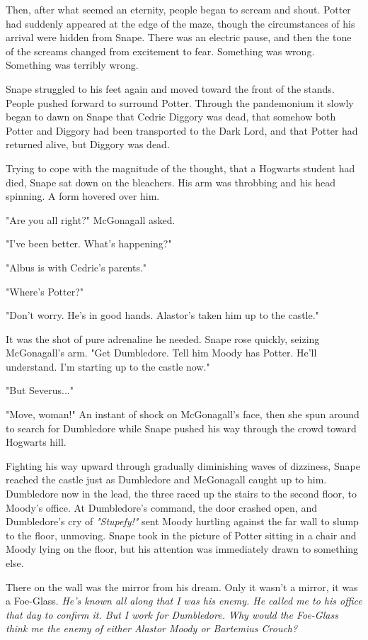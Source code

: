 Then, after what seemed an eternity, people began to scream and shout. Potter had suddenly appeared at the edge of the maze, though the circumstances of his arrival were hidden from Snape. There was an electric pause, and then the tone of the screams changed from excitement to fear. Something was wrong. Something was terribly wrong.

Snape struggled to his feet again and moved toward the front of the stands. People pushed forward to surround Potter. Through the pandemonium it slowly began to dawn on Snape that Cedric Diggory was dead, that somehow both Potter and Diggory had been transported to the Dark Lord, and that Potter had returned alive, but Diggory was dead.

Trying to cope with the magnitude of the thought, that a Hogwarts student had died, Snape sat down on the bleachers. His arm was throbbing and his head spinning. A form hovered over him.

"Are you all right?" McGonagall asked.

"I've been better. What's happening?"

"Albus is with Cedric's parents."

"Where's Potter?"

"Don't worry. He's in good hands. Alastor's taken him up to the castle."

It was the shot of pure adrenaline he needed. Snape rose quickly, seizing McGonagall's arm. "Get Dumbledore. Tell him Moody has Potter. He'll understand. I'm starting up to the castle now."

"But Severus..."

"Move, woman!" An instant of shock on McGonagall's face, then she spun around to search for Dumbledore while Snape pushed his way through the crowd toward Hogwarts hill.

Fighting his way upward through gradually diminishing waves of dizziness, Snape reached the castle just as Dumbledore and McGonagall caught up to him. Dumbledore now in the lead, the three raced up the stairs to the second floor, to Moody's office. At Dumbledore's command, the door crashed open, and Dumbledore's cry of \emph{"Stupefy!"} sent Moody hurtling against the far wall to slump to the floor, unmoving. Snape took in the picture of Potter sitting in a chair and Moody lying on the floor, but his attention was immediately drawn to something else.

There on the wall was the mirror from his dream. Only it wasn't a mirror, it was a Foe-Glass. \emph{He's known all along that I was his enemy. He called me to his office that day to confirm it. But I work for Dumbledore. Why would the Foe-Glass think me the enemy of either Alastor Moody or Bartemius Crouch?}

